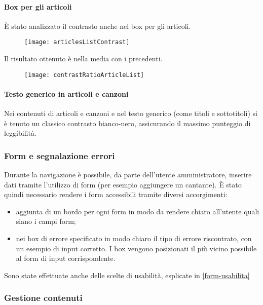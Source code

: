 \paragraph{Box per gli articoli}È stato analizzato il contrasto anche nel box per gli articoli.
\begin{figure}[H]

    \centering
    \texttt{[image: articlesListContrast]}

\end{figure}

Il risultato ottenuto è nella media con i precedenti.
\begin{figure}[H]

    \centering
    \texttt{[image: contrastRatioArticleList]}

\end{figure}

\paragraph*{Testo generico in articoli e canzoni}Nei contenuti di articoli e canzoni e nel testo generico (come titoli e sottotitoli) si è tenuto un classico contrasto bianco-nero, assicurando il massimo punteggio di leggibilità.

\subsubsection{Form e segnalazione errori}
\label{form-accessibilita}
Durante la navigazione è possibile, da parte dell'utente amministratore, inserire dati tramite l'utilizzo di form (per esempio aggiungere un cantante). È stato quindi necessario rendere i form accessibili tramite diversi accorgimenti:
\begin{itemize}

    \item aggiunta di un bordo per ogni form in modo da rendere chiaro all'utente quali siano i campi form;
    \item nei box di errore specificato in modo chiaro il tipo di errore riscontrato, con un esempio di input corretto. I box vengono posizionati il più vicino possibile al form di input corrispondente.

\end{itemize}
Sono state effettuate anche delle scelte di usabilità, esplicate in \ref{form-usabilita}

\subsubsection{Gestione contenuti}

